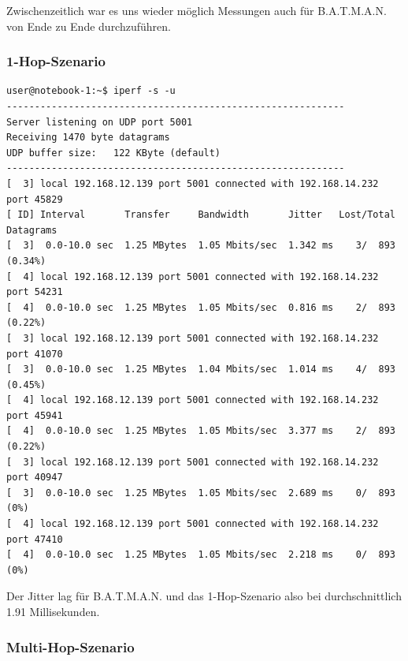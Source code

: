 \documentclass[a4paper,10pt]{article}
\begin{document}
Zwischenzeitlich war es uns wieder möglich Messungen auch für B.A.T.M.A.N. von Ende zu Ende durchzuführen.

\subsubsection*{1-Hop-Szenario}

\begin{lstlisting}
user@notebook-1:~$ iperf -s -u
------------------------------------------------------------
Server listening on UDP port 5001
Receiving 1470 byte datagrams
UDP buffer size:   122 KByte (default)
------------------------------------------------------------
[  3] local 192.168.12.139 port 5001 connected with 192.168.14.232 port 45829
[ ID] Interval       Transfer     Bandwidth       Jitter   Lost/Total Datagrams
[  3]  0.0-10.0 sec  1.25 MBytes  1.05 Mbits/sec  1.342 ms    3/  893 (0.34%)
[  4] local 192.168.12.139 port 5001 connected with 192.168.14.232 port 54231
[  4]  0.0-10.0 sec  1.25 MBytes  1.05 Mbits/sec  0.816 ms    2/  893 (0.22%)
[  3] local 192.168.12.139 port 5001 connected with 192.168.14.232 port 41070
[  3]  0.0-10.0 sec  1.25 MBytes  1.04 Mbits/sec  1.014 ms    4/  893 (0.45%)
[  4] local 192.168.12.139 port 5001 connected with 192.168.14.232 port 45941
[  4]  0.0-10.0 sec  1.25 MBytes  1.05 Mbits/sec  3.377 ms    2/  893 (0.22%)
[  3] local 192.168.12.139 port 5001 connected with 192.168.14.232 port 40947
[  3]  0.0-10.0 sec  1.25 MBytes  1.05 Mbits/sec  2.689 ms    0/  893 (0%)
[  4] local 192.168.12.139 port 5001 connected with 192.168.14.232 port 47410
[  4]  0.0-10.0 sec  1.25 MBytes  1.05 Mbits/sec  2.218 ms    0/  893 (0%)
\end{lstlisting}

Der Jitter lag für B.A.T.M.A.N. und das 1-Hop-Szenario also bei durchschnittlich 1.91 Millisekunden.

\subsubsection*{Multi-Hop-Szenario}
\end{document}
